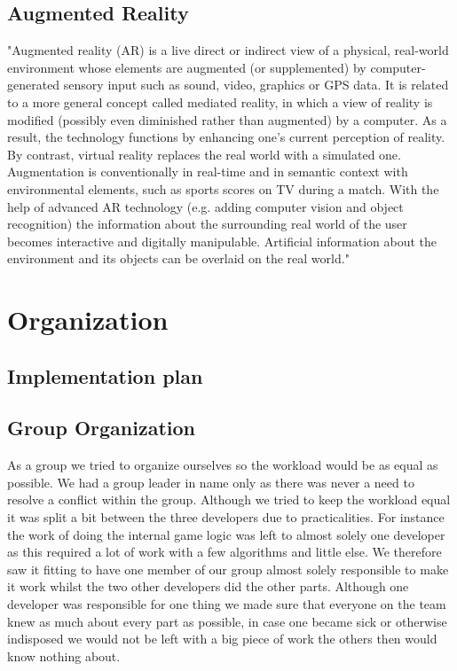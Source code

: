 


\section{Augmented Reality}
"Augmented reality (AR) is a live direct or indirect view of a physical, real-world environment whose elements are augmented (or supplemented) by computer-generated sensory input such as sound, video, graphics or GPS data. It is related to a more general concept called mediated reality, in which a view of reality is modified (possibly even diminished rather than augmented) by a computer. As a result, the technology functions by enhancing one’s current perception of reality. By contrast, virtual reality replaces the real world with a simulated one. Augmentation is conventionally in real-time and in semantic context with environmental elements, such as sports scores on TV during a match. With the help of advanced AR technology (e.g. adding computer vision and object recognition) the information about the surrounding real world of the user becomes interactive and digitally manipulable. Artificial information about the environment and its objects can be overlaid on the real world."\cite{WikiAugmentedReality}



\chapter{Organization}

\section{Implementation plan}

\section{Group Organization}
As a group we tried to organize ourselves so the workload would be as equal as possible. We had a group leader in name only as there was never a need to resolve a conflict within the group.
Although we tried to keep the workload equal it was split a bit between the three developers due to practicalities. 
For instance the work of doing the internal game logic was left to almost solely one developer as this required a lot of work with a few algorithms and little else.
We therefore saw it fitting to have one member of our group almost solely responsible to make it work whilst the two other developers did the other parts.
Although one developer was responsible for one thing we made sure that everyone on the team knew as much about every part as possible, in case one became sick or otherwise indisposed we would not be left with a big piece of work the others then would know nothing about.


